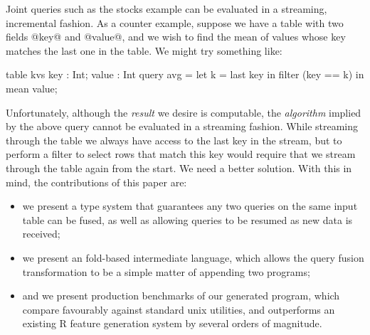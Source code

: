 Joint queries such as the stocks example can be evaluated in a streaming, incremental fashion. As a counter example, suppose we have a table with two fields @key@ and @value@, and we wish to find the mean of values whose key matches the last one in the table. We might try something like:
\begin{code}
  table kvs { key : Int; value : Int }
  query avg = let k = last key
              in  filter (key == k) in mean value;
\end{code}
Unfortunately, although the \emph{result} we desire is computable, the \emph{algorithm} implied by the above query cannot be evaluated in a streaming fashion. While streaming through the table we always have access to the last key in the stream, but to perform a filter to select rows that match this key would require that we stream through the table again from the start. We need a better solution. With this in mind, the contributions of this paper are:
\begin{itemize}
\item
we present a type system that guarantees any two queries on the same input table can be fused, as well as allowing queries to be resumed as new data is received;

\item
we present an fold-based intermediate language, which allows the query fusion transformation to be a simple matter of appending two programs;

\item
and we present production benchmarks of our generated program, which compare favourably against standard unix utilities, and outperforms an existing R feature generation system by several orders of magnitude.
\end{itemize}




